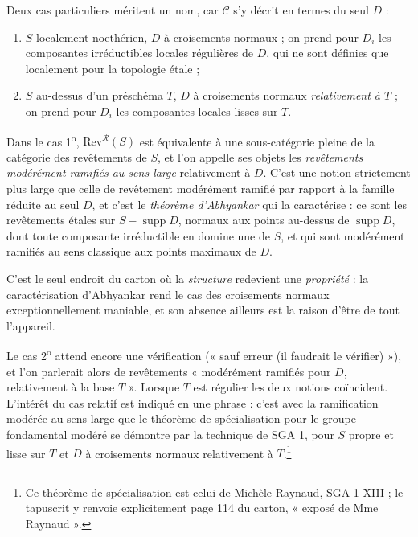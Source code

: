 \documentclass[11pt,a4paper]{article}
\begin{document}
Deux cas particuliers méritent un nom, car $\mathcal{C}$ s'y décrit en termes
du seul $D$ :

\begin{enumerate}
  \item[1\textsuperscript{o})] $S$ localement noethérien, $D$ à croisements
    normaux ; on prend pour $D_{i}$ les composantes irréductibles locales
    régulières de $D$, qui ne sont définies que localement pour la topologie
    étale ;
  \item[2\textsuperscript{o})] $S$ au-dessus d'un préschéma $T$, $D$ à
    croisements normaux \emph{relativement à $T$} ; on prend pour $D_{i}$ les
    composantes locales lisses sur $T$.
\end{enumerate}

Dans le cas 1\textsuperscript{o}, $\mathrm{Rev}^{\mathcal{R}}(S)$ est
équivalente à une sous-catégorie pleine de la catégorie des revêtements de $S$,
et l'on appelle ses objets les \emph{revêtements modérément ramifiés au sens
large} relativement à $D$. C'est une notion strictement plus large que celle de
revêtement modérément ramifié par rapport à la famille réduite au seul $D$, et
c'est le \emph{théorème d'Abhyankar} qui la caractérise : ce sont les
revêtements étales sur $S - \operatorname{supp} D$, normaux aux points
au-dessus de $\operatorname{supp} D$, dont toute composante irréductible en
domine une de $S$, et qui sont modérément ramifiés au sens classique aux points
maximaux de $D$.

C'est le seul endroit du carton où la \emph{structure} redevient une
\emph{propriété} : la caractérisation d'Abhyankar rend le cas des croisements
normaux exceptionnellement maniable, et son absence ailleurs est la raison
d'être de tout l'appareil.

Le cas 2\textsuperscript{o} attend encore une vérification (« sauf erreur
(il faudrait le vérifier) »), et l'on parlerait alors de revêtements
« modérément ramifiés pour $D$, relativement à la base $T$ ». Lorsque $T$ est
régulier les deux notions coïncident. L'intérêt du cas relatif est indiqué en
une phrase : c'est avec la ramification modérée au sens large que le théorème
de spécialisation pour le groupe fondamental modéré se démontre par la
technique de SGA 1, pour $S$ propre et lisse sur $T$ et $D$ à croisements
normaux relativement à $T$.\footnote{Ce théorème de spécialisation est celui de
Michèle Raynaud, SGA 1 XIII ; le tapuscrit y renvoie explicitement page 114 du
carton, « exposé de Mme Raynaud ».}

\end{document}
